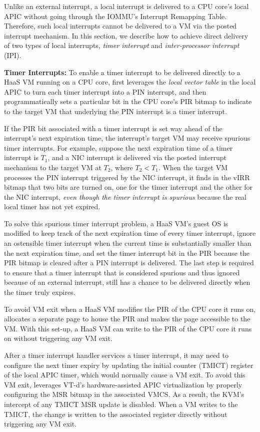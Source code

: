 Unlike an external interrupt, a local interrupt is delivered to a CPU core's local APIC without going through the IOMMU's Interrupt Remapping Table.
Therefore, such local interrupts cannot be delivered to a VM via the posted interrupt mechanism.
In this section, we describe how to achieve direct delivery of two types of local interrupts, {\em timer interrupt} and {\em inter-processor interrupt} (IPI).

{\bf Timer Interrupts:} To enable a timer interrupt to be delivered directly to a HaaS VM running on a CPU core,
\na first leverages the {\em local vector table} in the local APIC to turn each timer interrupt into a PIN interrupt, and 
then programmatically sets a particular bit in the CPU core's PIR bitmap to indicate to the target VM that underlying the PIN interrupt is a timer interrupt.

If the PIR bit associated with a timer interrupt is set way ahead of the interrupt's next expiration time, 
the interrupt's target VM may receive spurious timer interrupts. 
For example, suppose the next expiration time of a timer interrupt is $T_1$, and a NIC interrupt is delivered via the posted interrupt mechanism to the target VM at $T_2$, where ${T_2} < {T_1}$.
When the target  VM processes the PIN interrupt triggered by the NIC interrupt, it finds in the vIRR bitmap that two bits are turned on, one for the timer interrupt and the other for the NIC
interrupt, {\em even though the timer interrupt is spurious} because the real local timer has not yet expired.

To solve this spurious timer interrupt problem, a HaaS VM's guest OS is modified to keep track of the next expiration time of every timer interrupt, ignore an ostensible timer interrupt when  
the current time is substantially smaller than the next expiration time, 
and set the timer interrupt bit in the PIR because the PIR bitmap is cleared 
after a PIN interrupt is delivered.
The last step is required to ensure that a timer interrupt that is considered spurious and thus ignored because of an external interrupt,  still has a chance to be delivered directly when the timer truly expires.  

To avoid VM exit when a HaaS VM modifies the PIR of the CPU core it runs on, 
\na allocates a separate page to house the PIR and makes the page accessible to the VM.
With this set-up, a HaaS VM can write to the PIR of the CPU core it runs on without triggering any VM exit.

After a timer interrupt handler services a timer interrupt, it may need to configure the next timer expiry by updating the initial counter (TMICT) register of the local APIC timer, 
which would normally cause a VM exit. To avoid this VM exit, \na leverages VT-d's hardware-assisted APIC virtualization by properly configuring the MSR bitmap in the associated VMCS. 
As a result, the KVM's  intercept of any TMICT MSR update is disabled. When a VM writes to the TMICT, the change is written to the associated register directly without triggering any VM exit.     

